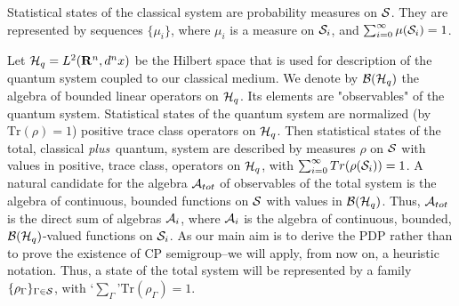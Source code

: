 \documentclass[12pt]{article}
\def\tr{\mbox{Tr}}
\begin{document}
Statistical states of the classical system are probability measures on
${\cal S}$. They are represented by sequences $\{ \mu_i \}$, where $ \mu_i$
is a measure on ${\cal S}_i$, and $\sum_{i=0}^{\infty }\mu ({\cal S}_i) =1$.

Let ${\cal H}_q= {\sl L}^2({\bf R}^n,d^n x)$ be the Hilbert space that is
used for description of the quantum system coupled to our classical medium.
We denote by ${\cal B} ({\cal H}_q )$ the algebra of bounded linear
operators on ${\cal H}_q$. Its elements are "observables" of the quantum
system. Statistical states of the quantum system are normalized (by $\tr
(\rho )=1$) positive trace class operators on ${\cal H}_q$. Then
statistical states of the total, classical {\sl plus}\, quantum, system are
described by measures $\rho $ on ${\cal S}$ with values in positive, trace
class, operators on ${\cal H}_q$, with $\sum_{i=0}^{\infty }Tr ( \rho
({\cal S}_i )) =1$. A natural candidate for the algebra ${\cal A}_{tot}$ of
observables of the total system is the algebra of continuous, bounded
functions on ${\cal S}$ with values in ${\cal B} ({\cal H}_q )$. Thus,
${\cal A}_{tot}$ is the direct sum of algebras ${\cal A}_i$, where ${\cal
A}_i$ is the algebra of continuous, bounded, ${\cal B} ({\cal
H}_q)$-valued functions on ${\cal S}_i$. As our main aim is to derive the
PDP rather than to prove the existence of CP semigroup--we will apply,
from now on, a heuristic notation. Thus, a state of the total system will
be represented by a family $\{ \rho_\Gamma \}_{\Gamma\in {\cal S}}$, with
\lq$\sum_\Gamma$\rq $\tr(\rho_\Gamma)=1$.
\end{document}

